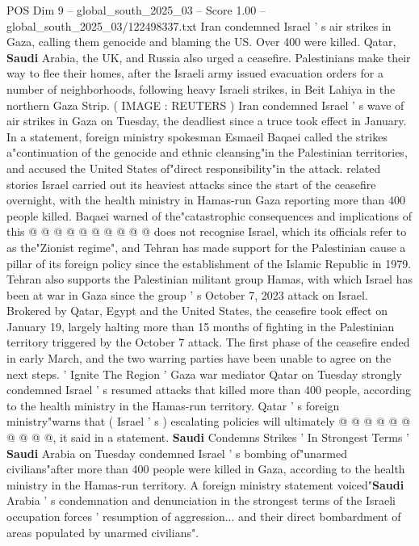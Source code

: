 \begin{textsample}{POS Dim 9 – global\_south\_2025\_03 – Score 1.00 – global\_south\_2025\_03/122498337.txt}  \label{ex:f9_pos_054}
Iran condemned Israel ' s air strikes in Gaza, calling them genocide and blaming the US.
Over 400 were killed.
Qatar, \textbf{Saudi} Arabia, the UK, and Russia also urged a ceasefire.
Palestinians make their way to flee their homes, after the Israeli army issued evacuation orders for a number of neighborhoods, following heavy Israeli strikes, in Beit Lahiya in the northern Gaza Strip. ( IMAGE : REUTERS ) Iran condemned Israel ' s wave of air strikes in Gaza on Tuesday, the deadliest since a truce took effect in January.
In a statement, foreign ministry spokesman Esmaeil Baqaei called the strikes a"continuation of the genocide and ethnic cleansing"in the Palestinian territories, and accused the United States of"direct responsibility"in the attack. related stories Israel carried out its heaviest attacks since the start of the ceasefire overnight, with the health ministry in Hamas-run Gaza reporting more than 400 people killed.
Baqaei warned of the"catastrophic consequences and implications of this @ @ @ @ @ @ @ @ @ @ does not recognise Israel, which its officials refer to as the"Zionist regime", and Tehran has made support for the Palestinian cause a pillar of its foreign policy since the establishment of the Islamic Republic in 1979.
Tehran also supports the Palestinian militant group Hamas, with which Israel has been at war in Gaza since the group ' s October 7, 2023 attack on Israel.
Brokered by Qatar, Egypt and the United States, the ceasefire took effect on January 19, largely halting more than 15 months of fighting in the Palestinian territory triggered by the October 7 attack.
The first phase of the ceasefire ended in early March, and the two warring parties have been unable to agree on the next steps. ' Ignite The Region ' Gaza war mediator Qatar on Tuesday strongly condemned Israel ' s resumed attacks that killed more than 400 people, according to the health ministry in the Hamas-run territory.
Qatar ' s foreign ministry"warns that ( Israel ' s ) escalating policies will ultimately @ @ @ @ @ @ @ @ @ @, it said in a statement. \textbf{Saudi} Condemns Strikes ' In Strongest Terms ' \textbf{Saudi} Arabia on Tuesday condemned Israel ' s bombing of"unarmed civilians"after more than 400 people were killed in Gaza, according to the health ministry in the Hamas-run territory.
A foreign ministry statement voiced"\textbf{Saudi} Arabia ' s condemnation and denunciation in the strongest terms of the Israeli occupation forces ' resumption of aggression... and their direct bombardment of areas populated by unarmed civilians".

\end{textsample}
